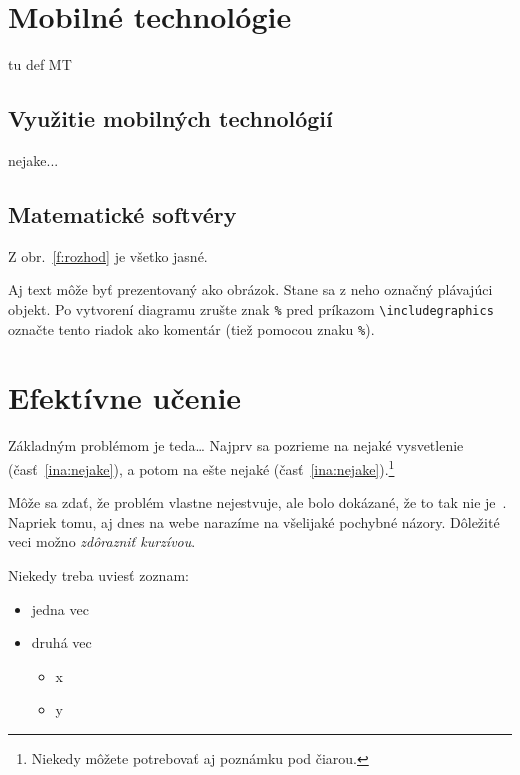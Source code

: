\documentclass[10pt,twoside,slovak,a4paper]{article}
\begin{document}
\section{Mobilné technológie} \label{nejaka}

tu def MT 

\subsection{Využitie mobilných technológií} \label{ina:vyuzitie}

nejake...

\subsection{Matematické softvéry} \label{ina:softvery}

Z obr.~\ref{f:rozhod} je všetko jasné. 

\begin{figure*}[tbh]
\centering
Aj text môže byť prezentovaný ako obrázok. Stane sa z neho označný plávajúci objekt. Po vytvorení diagramu zrušte znak \texttt{\%} pred príkazom \verb|\includegraphics| označte tento riadok ako komentár (tiež pomocou znaku \texttt{\%}).
\caption{Rozhodujúci argument.}
\label{f:rozhod}
\end{figure*}



\section{Efektívne učenie} \label{ucenie}

Základným problémom je teda\ldots{} Najprv sa pozrieme na nejaké vysvetlenie (časť~\ref{ina:nejake}), a potom na ešte nejaké (časť~\ref{ina:nejake}).\footnote{Niekedy môžete potrebovať aj poznámku pod čiarou.}

Môže sa zdať, že problém vlastne nejestvuje\cite{Coplien:MPD}, ale bolo dokázané, že to tak nie je~\cite{Czarnecki:Staged, Czarnecki:Progress}. Napriek tomu, aj dnes na webe narazíme na všelijaké pochybné názory\cite{PLP-Framework}. Dôležité veci možno \emph{zdôrazniť kurzívou}.


Niekedy treba uviesť zoznam:

\begin{itemize}
\item jedna vec
\item druhá vec
	\begin{itemize}
	\item x
	\item y
	\end{itemize}
\end{itemize}
\end{document}
